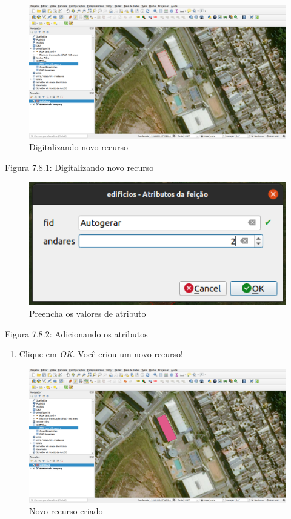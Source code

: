 \documentclass[
]{book}
\providecommand{\tightlist}{%
  \setlength{\itemsep}{0pt}\setlength{\parskip}{0pt}}
\begin{document}
\begin{figure}
\centering
\includegraphics{media/modulo7/digitize-1.png}
\caption{Digitalizando novo recurso}
\end{figure}

Figura 7.8.1: Digitalizando novo recurso

\begin{figure}
\centering
\includegraphics{media/modulo7/digitize-2.png}
\caption{Preencha os valores de atributo}
\end{figure}

Figura 7.8.2: Adicionando os atributos

\begin{enumerate}
\def\labelenumi{\arabic{enumi}.}
\setcounter{enumi}{15}
\tightlist
\item
  Clique em \emph{OK}. Você criou um novo recurso!
\end{enumerate}

\begin{figure}
\centering
\includegraphics{media/modulo7/digitize-3.png}
\caption{Novo recurso criado}
\end{figure}
\end{document}
